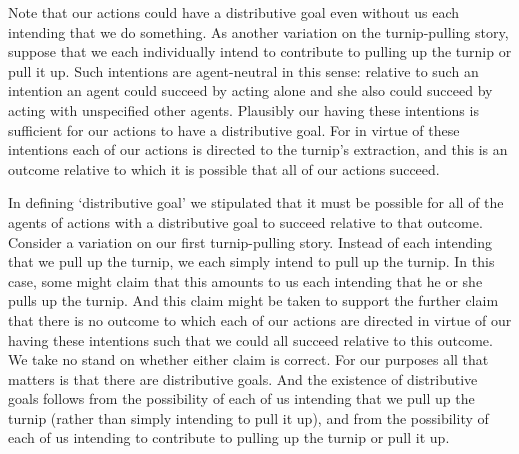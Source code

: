 \documentclass[12pt,\papersize]{extarticle}
\begin{document}

Note that our actions could have a distributive goal even without us each intending that we do something.
As another variation on the turnip-pulling story,
suppose that we each individually intend to 
	contribute to pulling up the turnip or pull it up.
Such intentions are agent-neutral in this sense:
relative to such an intention an agent 
	could succeed by acting alone 
and
  she also could succeed by acting with unspecified other agents.
Plausibly our having these intentions is sufficient for our actions to have a distributive goal.
For in virtue of these intentions each of our actions is directed to the turnip's extraction,
and this is an outcome relative to which it is possible that all of our actions succeed.


In defining `distributive goal' we stipulated that it must be possible for all of the agents of actions with a distributive goal to succeed relative to that outcome.
Consider a variation on our first turnip-pulling story.
Instead of each intending that we pull up the turnip,
we each simply intend  to pull up the turnip.
In this case,
some might claim that
this amounts to us each intending that he or she pulls up the turnip.
And this claim might be taken to support the further claim that
there is no outcome to which each of our actions are directed
in virtue of our having these intentions
such that we could all succeed relative to this outcome.
We take no stand on whether either claim is correct.
For our purposes all that matters is that there are distributive goals.
And the existence of distributive goals follows from the possibility of each of us 
intending that we pull up the turnip
(rather than simply
intending to pull it up),
and from the possibility of each of us
intending to contribute to pulling up the turnip or pull it up.
\end{document}
